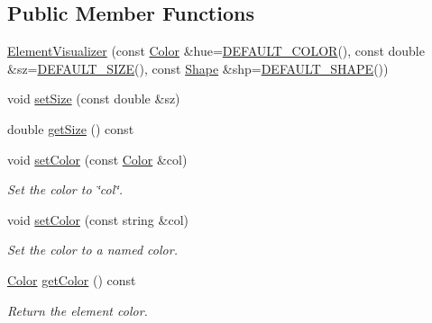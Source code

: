 \subsection*{Public Member Functions}
\begin{DoxyCompactItemize}
\item 
\hyperlink{classbridges_1_1datastructure_1_1_element_visualizer_a8104e42b94927a9b45a237064d75ca33}{Element\+Visualizer} (const \hyperlink{classbridges_1_1datastructure_1_1_color}{Color} \&hue=\hyperlink{classbridges_1_1datastructure_1_1_element_visualizer_a777a0295e8216e403108a6c90ce6790b}{D\+E\+F\+A\+U\+L\+T\+\_\+\+C\+O\+L\+OR}(), const double \&sz=\hyperlink{classbridges_1_1datastructure_1_1_element_visualizer_afa0fa3f844171f311c3d9c9025a826c5}{D\+E\+F\+A\+U\+L\+T\+\_\+\+S\+I\+ZE}(), const \hyperlink{namespacebridges_1_1datastructure_a3408f5f44d9c6062e5f3adb7e1bbb7f0}{Shape} \&shp=\hyperlink{classbridges_1_1datastructure_1_1_element_visualizer_adfba1c4d4f04ff92545d932bfce5b9d1}{D\+E\+F\+A\+U\+L\+T\+\_\+\+S\+H\+A\+PE}())
\item 
void \hyperlink{classbridges_1_1datastructure_1_1_element_visualizer_a021333b1c20dd55627ac80ae3a2138e6}{set\+Size} (const double \&sz)
\item 
double \hyperlink{classbridges_1_1datastructure_1_1_element_visualizer_a5c83b976308b254521189280bfbfbc43}{get\+Size} () const
\item 
void \hyperlink{classbridges_1_1datastructure_1_1_element_visualizer_aabf1373100f7c45b71d0caf04427644f}{set\+Color} (const \hyperlink{classbridges_1_1datastructure_1_1_color}{Color} \&col)
\begin{DoxyCompactList}\small\item\em Set the color to \char`\"{}col\char`\"{}. \end{DoxyCompactList}\item 
void \hyperlink{classbridges_1_1datastructure_1_1_element_visualizer_a0068ebe250375b13c5b3d4af0df20dea}{set\+Color} (const string \&col)
\begin{DoxyCompactList}\small\item\em Set the color to a named color. \end{DoxyCompactList}\item 
\hyperlink{classbridges_1_1datastructure_1_1_color}{Color} \hyperlink{classbridges_1_1datastructure_1_1_element_visualizer_a611005282caa27575cf3ee7e3b1540c4}{get\+Color} () const
\begin{DoxyCompactList}\small\item\em Return the element color. \end{DoxyCompactList}\item 

\end{DoxyCompactItemize}
